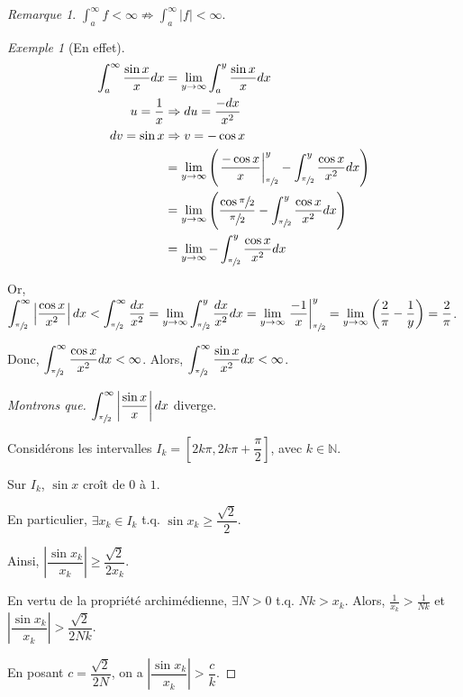 \documentclass{report}
\newcommand*{\abs}[1]{\left| #1 \right|}
\newcommand*{\naturels}{\mathbb{N}}
\theoremstyle{definition}
\theoremstyle{remark}
\newtheorem*{exem}{Exemple}
\newtheorem*{rema}{Remarque}
\begin{document}
	\begin{rema}
		$\displaystyle\int_{a}^{\infty} f < \infty \not\Rightarrow \displaystyle\int_{a}^{\infty}\abs{f} < \infty$.
		\begin{exem}[En effet]
			\begin{align*}
				\int_{a}^{\infty}\dfrac{\sin x}{x} dx&= \lim_{y \to \infty}\int_{a}^{y}\dfrac{\sin x}{x} dx\\
				u=\frac{1}{x}&\Rightarrow du=\frac{-dx}{x^2}\\
				dv=\sin x&\Rightarrow v=-\cos x\\
				&= \lim_{y \to \infty}\left( \left. \dfrac{-\cos x}{x} \right|^y_{\sfrac{\pi}{2}} - \int_{\sfrac{\pi}{2}}^{y}\dfrac{\cos x}{x^2} dx \right)\\
				&= \lim_{y \to \infty}\left( \dfrac{\cos\sfrac{\pi}{2}}{\sfrac{\pi}{2}} - \int_{\sfrac{\pi}{2}}^y\dfrac{\cos x}{x^2} dx \right)\\
				&= \lim_{y \to \infty}-\int_{\sfrac{\pi}{2}}^{y} \dfrac{\cos x}{x^2} dx
			\end{align*}

			Or, $\displaystyle\int_{\sfrac{\pi}{2}}^\infty \abs{\dfrac{\cos x}{x^2}} dx < \displaystyle\int_{\sfrac{\pi}{2}}^\infty \dfrac{dx}{x^2} = \lim_{y \to \infty} \displaystyle\int_{\sfrac{\pi}{2}}^y \dfrac{dx}{x^2} dx = \lim_{y \to \infty}\left. \dfrac{-1}{x}\right|^y_{\sfrac{\pi}{2}} = \lim_{y \to \infty}\left( \dfrac{2}{\pi} - \dfrac{1}{y} \right) = \dfrac{2}{\pi}$.

			Donc, $\displaystyle\int_{\sfrac{\pi}{2}}^\infty \dfrac{\cos x}{x^2} dx < \infty$. Alors, $\displaystyle\int_{\sfrac{\pi}{2}}^\infty \dfrac{\sin x}{x^2} dx < \infty$.
			\begin{proof}[Montrons que]
				$\displaystyle\int_{\sfrac{\pi}{2}}^\infty \abs{\dfrac{\sin x}{x}} dx$ diverge.

				Consid\'erons les intervalles $I_k = \left[ 2k\pi, 2k\pi+\dfrac{\pi}{2} \right]$, avec $k \in \naturels$.

				Sur $I_k$, $\sin x$ cro\^it de $0$ \`a $1$.

				En particulier, $\exists x_k \in I_k$ t.q. $\sin x_k \geq \dfrac{\sqrt{2}}{2}$.

				Ainsi, $\abs{\dfrac{\sin x_k}{x_k}} \geq \dfrac{\sqrt{2}}{2x_k}$.

				En vertu de la propri\'et\'e archim\'edienne, $\exists N>0$ t.q. $Nk>x_k$. Alors, $\frac{1}{x_k} > \frac{1}{Nk}$ et $\abs{\dfrac{\sin x_k}{x_k}} > \dfrac{\sqrt{2}}{2Nk}$.

				En posant $c=\dfrac{\sqrt{2}}{2N}$, on a $\abs{\dfrac{\sin x_k}{x_k}} > \dfrac{c}{k}$.


\end{proof}
\end{exem}
\end{rema}
\end{document}
